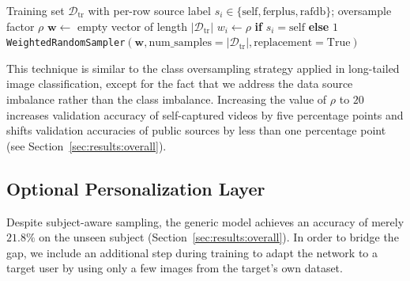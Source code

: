 \documentclass[12pt,a4paper]{article}
\begin{document}
\begin{algorithm}[H]
\small
\caption{\footnotesize Subject-aware weighted random sampler}
\label{alg:sampler}
\begin{algorithmic}[1]
\Require Training set $\mathcal{D}_{\text{tr}}$ with per-row source
         label $s_i \in \{\text{self},\text{ferplus},\text{rafdb}\}$;
         oversample factor $\rho$
  \State $\mathbf{w} \gets$ empty vector of length $|\mathcal{D}_{\text{tr}}|$
    \State $w_i \gets \rho$ \textbf{if} $s_i = \text{self}$ \textbf{else} $1$
  \EndFor
  \State \Return \texttt{WeightedRandomSampler}$(\mathbf{w},
         \text{num\_samples}=|\mathcal{D}_{\text{tr}}|,
         \text{replacement}=\text{True})$
\EndFunction
\end{algorithmic}
\end{algorithm}

This technique is similar to the class oversampling strategy
applied in long-tailed image classification, except for the fact
that we address the data source imbalance rather than the class
imbalance. Increasing the value of $\rho$ to $20$ increases
validation accuracy of self-captured videos by five percentage
points and shifts validation accuracies of public sources by
less than one percentage point (see
Section~\ref{sec:results:overall}).

\subsection{Optional Personalization Layer}
\label{sec:impl:personalize}

Despite subject-aware sampling, the generic model achieves an
accuracy of merely $21.8\%$ on the unseen subject
(Section~\ref{sec:results:overall}). In order to bridge the gap,
we include an additional step during training to adapt the
network to a target user by using only a few images from the
target's own dataset.
\end{document}
